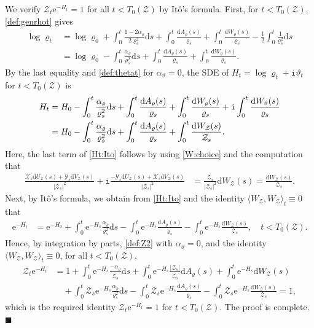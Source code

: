 \documentclass[12pt, twoside]{article}
\numberwithin{figure}{section}
\newcommand{\e}{{\mathrm e}}
\newcommand{\1}{\mathds 1}
\newcommand{\la}{{\langle}}
\newcommand{\ra}{{\rangle}}
\newcommand{\mc}{\mathcal}
\renewcommand{\d}{{\mathrm d}}
\newcommand{\2}{{\mathbf 1}}
\renewcommand{\i}{{\mathtt i}}
\renewenvironment{proof}[1][\proofname]{\noindent {\bfseries #1.}\;}{\hfill\ensuremath{\blacksquare}\\}
\newcommand{\cc}{{^\circ}}
\begin{document}
\begin{proof}[Proof of Proposition~\ref{prop:SP} (2$\cc$)]
We verify $\mc Z_t\e^{-H_t}=1$ for all $t<T_0(\mc Z)$ by It\^{o}'s formula. First, for $t<T_0(\mathcal Z)$, \eqref{def:genrhot} gives
\begin{align*}
\log \varrho_t&=\log \varrho_0+\int_0^t \frac{1-2\alpha_\varrho}{2\varrho_s^2}\d s+\int_0^t \frac{\d A_\varrho(s)}{\varrho_s}+\int_0^t \frac{\d W_\varrho(s)}{\varrho_s}-\frac{1}{2}\int_0^t \frac{1}{\varrho_s^2}\d s\\
&=\log \varrho_0-\int_0^t \frac{\alpha_\varrho}{\varrho^2_s}\d s+\int_0^t \frac{\d A_\varrho(s)}{\varrho_s}+\int_0^t \frac{\d W_\varrho(s)}{\varrho_s}.
\end{align*}
By the last equality and \eqref{def:thetat} for $\alpha_\vartheta=0$, the SDE of $H_t=\log \varrho_t+\i\vartheta_t$ for $t<T_0(\mathcal Z)$ is 
\begin{align}
H_t&=H_0-\int_0^t \frac{\alpha_\varrho}{\varrho^2_s}\d s+\int_0^t \frac{\d A_\varrho(s)}{\varrho_s}+\int_0^t \frac{\d W_\varrho(s)}{\varrho_s}+\i\int_0^t \frac{\d W_\vartheta(s)}{\varrho_s}\notag\\
&=H_0-\int_0^t \frac{\alpha_\varrho}{\varrho^2_s}\d s+\int_0^t \frac{\d A_\varrho(s)}{\varrho_s}+\int_0^t \frac{\d W_\mathcal Z(s)}{\mathcal Z_s}.\label{Ht:Ito}
\end{align}
Here, the last term of \eqref{Ht:Ito} follows by using \eqref{W:choice} and the computation that
\begin{align*}
\frac{\mathcal X_s\d U_\mathcal Z(s)+\mathcal Y_s\d V_\mathcal Z(s)}{|\mc Z_s|^2}+\i \frac{-\mathcal Y_s\d U_\mathcal Z(s)+\mathcal X_s\d V_\mathcal Z(s)}{|\mc Z_s|^2}
&=\frac{\overline{\mathcal Z}_s}{|\mc Z_s|^2}\d W_\mathcal Z(s)=\frac{\d W_{\mc Z}(s)}{\mc Z_s}.
\end{align*}
Next,  by It\^{o}'s formula, we obtain from \eqref{Ht:Ito} and the identity $\la W_\mathcal Z,W_\mathcal Z\ra_t\equiv 0$ that
\begin{align*}
\e^{-H_t}
&=\e^{-H_0}+\int_0^t \e^{-H_s}\frac{\alpha_\varrho}{\varrho_s^2}\d s-\int_0^t\e^{-H_s}\frac{\d A_\varrho(s)}{\varrho_s}-\int_0^t \e^{-H_s}\frac{\d W_\mathcal Z(s)}{\mathcal Z_s},\quad t<T_0(\mc Z).
\end{align*}
Hence, by integration by parts, \eqref{def:Z2} with $\alpha_\vartheta=0$, and the identity $\la W_\mathcal Z,W_\mathcal Z\ra_t\equiv 0$, for all $t<T_0(\mc Z)$,
\begin{align*}
\mathcal Z_t\e^{-H_t}
&=1+\int_0^t \e^{-H_s}\frac{-\alpha_\varrho}{\overline{\mathcal Z}_s}\d s+\int_0^t \e^{-H_s}\frac{|\mathcal Z_s|}{\overline{\mathcal Z}_s}\d A_\varrho(s)+
\int_0^t \e^{-H_s}\d W_\mathcal Z(s)\\
&\quad+\int_0^t \mathcal Z_s\e^{-H_s}\frac{\alpha_\varrho}{\varrho_s^2}\d s-\int_0^t \mathcal Z_s\e^{-H_s}\frac{\d A_\varrho(s)}{\varrho_s}-\int_0^t\mathcal Z_s \e^{-H_s}\frac{\d W_\mathcal Z(s)}{\mathcal Z_s}=1,
\end{align*}
which is the required identity $\mc Z_t\e^{-H_t}=1$ for $t<T_0(\mc Z)$. The proof is complete.
\end{proof}
\end{document}
